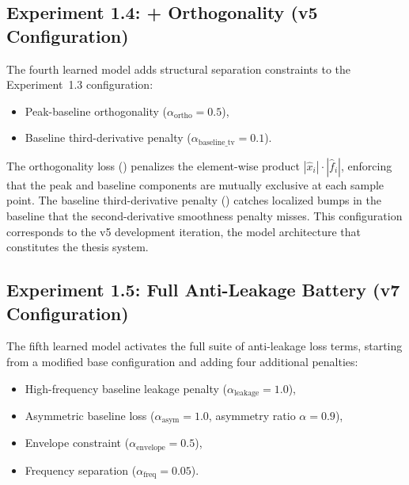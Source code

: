 \subsection{Experiment 1.4: + Orthogonality (v5 Configuration)}
\label{sec:exp_1_4}

The fourth learned model adds structural separation constraints to the Experiment~1.3 configuration:
\begin{itemize}
    \item Peak-baseline orthogonality ($\alpha_{\text{ortho}} = 0.5$),
    \item Baseline third-derivative penalty ($\alpha_{\text{baseline\_tv}} = 0.1$).
\end{itemize}

The orthogonality loss () penalizes the element-wise product $|\hat{x}_i| \cdot |\hat{f}_i|$, enforcing that the peak and baseline components are mutually exclusive at each sample point. The baseline third-derivative penalty () catches localized bumps in the baseline that the second-derivative smoothness penalty misses. This configuration corresponds to the v5 development iteration, the model architecture that constitutes the thesis system.


\subsection{Experiment 1.5: Full Anti-Leakage Battery (v7 Configuration)}
\label{sec:exp_1_5}

The fifth learned model activates the full suite of anti-leakage loss terms, starting from a modified base configuration and adding four additional penalties:
\begin{itemize}
    \item High-frequency baseline leakage penalty ($\alpha_{\text{leakage}} = 1.0$),
    \item Asymmetric baseline loss ($\alpha_{\text{asym}} = 1.0$, asymmetry ratio $\alpha = 0.9$),
    \item Envelope constraint ($\alpha_{\text{envelope}} = 0.5$),
    \item Frequency separation ($\alpha_{\text{freq}} = 0.05$).
\end{itemize}

